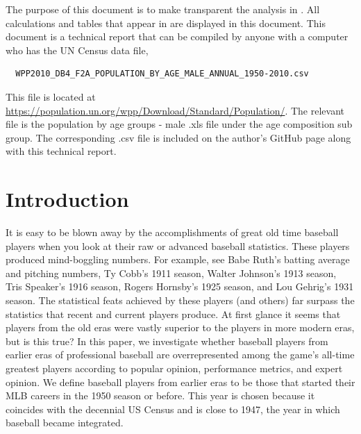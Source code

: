 \documentclass[11pt]{article}\usepackage[]{graphicx}\usepackage[]{color}
\begin{document}
The purpose of this document is to make transparent the analysis in 
\citet{eck2019challenging}.  All calculations and tables that appear in 
\citet{eck2019challenging} are displayed in this document.  
This document is a technical report that can be compiled by anyone with a 
computer who has the UN Census data file,
\begin{center}
\begin{verbatim}
  WPP2010_DB4_F2A_POPULATION_BY_AGE_MALE_ANNUAL_1950-2010.csv
\end{verbatim}
\end{center}
This file is located at \url{https://population.un.org/wpp/Download/Standard/Population/}. 
The relevant file is the population by age groups - male .xls file under the 
age composition sub group.  The corresponding .csv file is included on the 
author's GitHub page along with this technical report.  





\section{Introduction}
It is easy to be blown away by the accomplishments of great old time 
baseball players when you look at their raw or advanced baseball statistics.  
These players produced mind-boggling numbers. For example, see 
Babe Ruth's batting average and pitching numbers, 
Ty Cobb's 1911 season, 
Walter Johnson's 1913 season, 
Tris Speaker's 1916 season, 
Rogers Hornsby's 1925 season, 
and
Lou Gehrig's 1931 season.
The statistical feats achieved by these players (and others) far surpass 
the statistics that recent and current players produce.  At first glance 
it seems that players from the old eras were vastly superior to the 
players in more modern eras, but is this true? 
In this paper, we investigate whether baseball players from earlier 
eras of professional baseball are overrepresented among the game's all-time 
greatest players according to popular opinion, performance metrics, and expert 
opinion.  We define baseball players from earlier eras to be those that 
started their MLB careers in the 1950 season or before.  
This year is chosen because it coincides with the decennial US Census 
and is close to 1947, the year in which baseball became integrated. 
\end{document}
